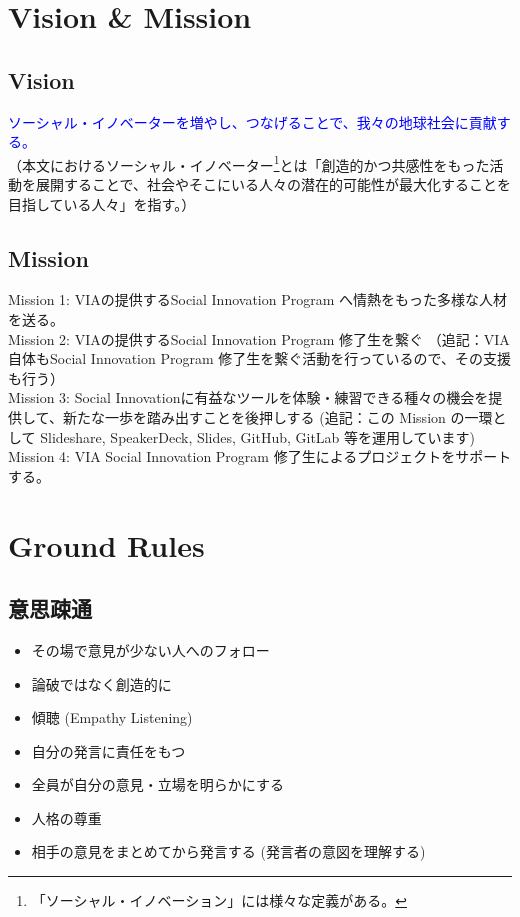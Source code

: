 \documentclass[dvipdfmx,11pt]{jsarticle}
\begin{document}
\section{Vision \& Mission}
\subsection{Vision}
\textcolor{blue}{ソーシャル・イノベーターを増やし、つなげることで、我々の地球社会に貢献する。}\\
（本文におけるソーシャル・イノベーター\footnote{「ソーシャル・イノベーション」には様々な定義がある\cite{open,new}。}とは「創造的かつ共感性をもった活動を展開することで、社会やそこにいる人々の潜在的可能性が最大化することを目指している人々」を指す。）
\subsection{Mission}
Mission 1: VIAの提供するSocial Innovation Program へ情熱をもった多様な人材を送る。\\

Mission 2: VIAの提供するSocial Innovation Program 修了生を繋ぐ （追記：VIA自体もSocial Innovation Program 修了生を繋ぐ活動を行っているので、その支援も行う）\\

Mission 3: Social Innovationに有益なツールを体験・練習できる種々の機会を提供して、新たな一歩を踏み出すことを後押しする (追記：この Mission の一環として Slideshare, SpeakerDeck, Slides, GitHub, GitLab 等を運用しています)\\

Mission 4: VIA Social Innovation Program 修了生によるプロジェクトをサポートする。
\section{Ground Rules}
\subsection{意思疎通}
\begin{itemize}
\item その場で意見が少ない人へのフォロー
\item 論破ではなく創造的に
\item 傾聴 (Empathy Listening\cite{power})
\item 自分の発言に責任をもつ
\item 全員が自分の意見・立場を明らかにする
\item 人格の尊重
\item 相手の意見をまとめてから発言する (発言者の意図を理解する)
\end{itemize}
\end{document}
